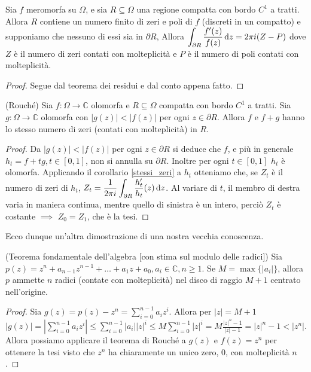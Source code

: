 \begin{cor} \label{stessi_zeri}
  Sia $f$ meromorfa su $\Omega$, e sia $R \subseteq \Omega$ una regione compatta con bordo $C^1$ a tratti. Allora $R$ contiene un numero finito di zeri e poli di $f$ (discreti in un compatto) e supponiamo che nessuno di essi sia in $\partial R$, Allora $\displaystyle \int_{\partial R} \frac{f'(z)}{f(z)}\mathop{}\!\mathrm{d} z=2\pi i(Z-P)$ dove $Z$ è il numero di zeri contati con molteplicità e $P$ è il numero di poli contati con molteplicità.
\end{cor}

\begin{proof}
  Segue dal teorema dei residui e dal conto appena fatto.
\end{proof}

\begin{thm}
  (Rouché) Sia $f:\Omega \longrightarrow \mathbb{C}$ olomorfa e $R \subseteq \Omega$ compatta con bordo $C^1$ a tratti. Sia $g:\Omega \longrightarrow \mathbb{C}$ olomorfa con $|g(z)|<|f(z)|$ per ogni $z \in \partial R$. Allora $f$ e $f+g$ hanno lo stesso numero di zeri (contati con molteplicità) in $R$.
\end{thm}

\begin{proof}
  Da $|g(z)|<|f(z)|$ per ogni $z \in \partial R$ si deduce che $f$, e più in generale $h_t=f+tg, t \in [0,1]$, non si annulla su $\partial R$. Inoltre per ogni $t \in [0,1]$ $h_t$ è olomorfa. Applicando il corollario \ref{stessi_zeri} a $h_t$ otteniamo che, se $Z_t$ è il numero di zeri di $h_t$, $\displaystyle Z_t=\dfrac{1}{2\pi i} \int_{\partial R} \dfrac{h_t'}{h_t}(z)\mathop{}\!\mathrm{d} z$.
  Al variare di $t$, il membro di destra varia in maniera continua, mentre quello di sinistra è un intero, perciò $Z_t$ è costante $\implies$ $Z_0=Z_1$, che è la tesi.
\end{proof}

Ecco dunque un'altra dimostrazione di una nostra vecchia conoscenza.

\begin{thm}
  (Teorema fondamentale dell'algebra [con stima sul modulo delle radici]) Sia $p(z)=z^n+a_{n-1}z^{n-1}+\dots+a_1z+a_0, a_i \in \mathbb{C}, n \ge 1$. Se $M=\max\{|a_i|\}$, allora $p$ ammette $n$ radici (contate con molteplicità) nel disco di raggio $M+1$ centrato nell'origine.
\end{thm}

\begin{proof}
  Sia $\displaystyle g(z)=p(z)-z^n=\sum_{i=0}^{n-1} a_iz^i$. Allora per $|z|=M+1$ $\displaystyle |g(z)|=\left|\sum_{i=0}^{n-1} a_iz^i\right| \le \sum_{i=0}^{n-1} |a_i||z|^i \le M \sum_{i=0}^{n-1} |z|^i=M\frac{|z|^n-1}{|z|-1}=|z|^n-1 < |z^n|$. Allora possiamo applicare il teorema di Rouché a $g(z)$ e $f(z)=z^n$ per ottenere la tesi visto che $z^n$ ha chiaramente un unico zero, $0$, con molteplicità $n$.
\end{proof}
